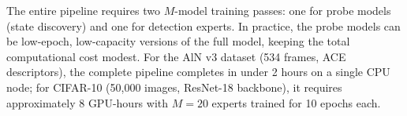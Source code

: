 The entire pipeline requires two $M$-model training passes: one for probe models (state discovery) and one for detection experts. In practice, the probe models can be low-epoch, low-capacity versions of the full model, keeping the total computational cost modest. For the AlN v3 dataset (534 frames, ACE descriptors), the complete pipeline completes in under 2 hours on a single CPU node; for CIFAR-10 (50,000 images, ResNet-18 backbone), it requires approximately 8 GPU-hours with $M = 20$ experts trained for 10 epochs each.

